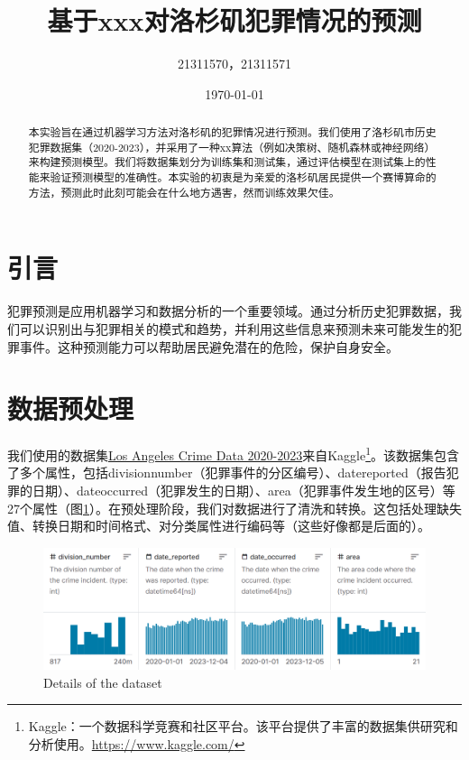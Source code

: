 \documentclass{article}
\begin{document}
\sloppy %

\title{基于xxx对洛杉矶犯罪情况的预测}
\author{21311570，21311571}
\date{\today}

\maketitle

\renewcommand{\abstractname}{摘要}  %

\begin{abstract}
    本实验旨在通过机器学习方法对洛杉矶的犯罪情况进行预测。我们使用了洛杉矶市历史犯罪数据集（2020-2023），并采用了一种xx算法（例如决策树、随机森林或神经网络）来构建预测模型。我们将数据集划分为训练集和测试集，通过评估模型在测试集上的性能来验证预测模型的准确性。本实验的初衷是为亲爱的洛杉矶居民提供一个赛博算命的方法，预测此时此刻可能会在什么地方遇害，然而训练效果欠佳。
\end{abstract}

\section{引言}
犯罪预测是应用机器学习和数据分析的一个重要领域。通过分析历史犯罪数据，我们可以识别出与犯罪相关的模式和趋势，并利用这些信息来预测未来可能发生的犯罪事件。这种预测能力可以帮助居民避免潜在的危险，保护自身安全。

\section{数据预处理}
我们使用的数据集\href{https://www.kaggle.com/datasets/asaniczka/crimes-in-los-angeles-2020-2023/data}{Los Angeles Crime Data 2020-2023}来自Kaggle\footnote{Kaggle：一个数据科学竞赛和社区平台。该平台提供了丰富的数据集供研究和分析使用。\url{https://www.kaggle.com/}}。该数据集包含了多个属性，包括division\textunderscore{}number（犯罪事件的分区编号）、date\textunderscore{}reported（报告犯罪的日期）、date\textunderscore{}occurred（犯罪发生的日期）、area（犯罪事件发生地的区号）等27个属性（图\ref{fig:Details}）。在预处理阶段，我们对数据进行了清洗和转换。这包括处理缺失值、转换日期和时间格式、对分类属性进行编码等（这些好像都是后面的）。

\begin{figure}[H]
    \centering
    \includegraphics[width=1\textwidth]{../pic/Screenshot 2024-01-12 111029.png}
    \caption{Details of the dataset}
    \label{fig:Details}
\end{figure}
\end{document}
